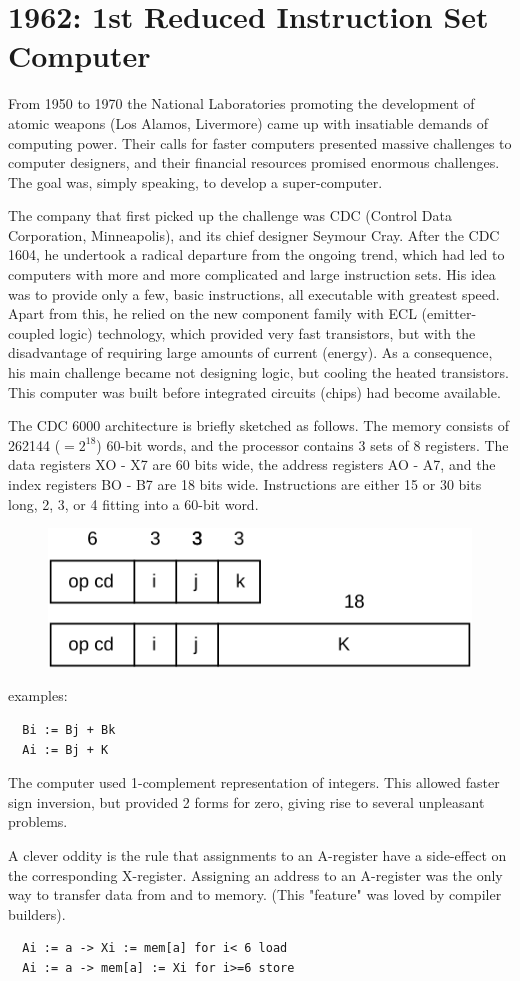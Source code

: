 \section{1962: 1st Reduced Instruction Set Computer}
From 1950 to 1970 the National Laboratories promoting the development of atomic
weapons (Los Alamos, Livermore) came up with insatiable demands of computing power.
Their calls for faster computers presented massive challenges to computer designers,
and their financial resources promised enormous challenges. The goal was, simply
speaking, to develop a super-computer.

The company that first picked up the challenge was CDC (Control Data Corporation,
Minneapolis), and its chief designer Seymour Cray. After the CDC 1604, he undertook
a radical departure from the ongoing trend, which had led to computers with more and
more complicated and large instruction sets. His idea was to provide only a few,
basic instructions, all executable with greatest speed. Apart from this, he relied on
the new component family with ECL (emitter-coupled logic) technology, which provided
very fast transistors, but with the disadvantage of requiring large amounts of current
(energy). As a consequence, his main challenge became not designing logic, but cooling
the heated transistors. This computer was built before integrated circuits (chips) had
become available.

The CDC 6000 architecture is briefly sketched as follows. The memory consists of
262144 ($=2^{18}$) 60-bit words, and the processor contains 3 sets of 8 registers.
The data registers XO - X7 are 60 bits wide, the address registers AO - A7, and the
index registers BO - B7 are 18 bits wide. Instructions are either 15 or 30 bits long,
2, 3, or 4 fitting into a 60-bit word.
\begin{figure}[h!]
  \centering
  \includegraphics[width=.5\textwidth]{i/2}
\end{figure}
examples:
\begin{verbatim}
  Bi := Bj + Bk
  Ai := Bj + K
\end{verbatim}

The computer used 1-complement representation of integers. This allowed faster
sign inversion, but provided 2 forms for zero, giving rise to several unpleasant
problems.

A clever oddity is the rule that assignments to an A-register have a side-effect on
the corresponding X-register. Assigning an address to an A-register was the only way
to transfer data from and to memory. (This "feature" was loved by compiler builders).
\begin{verbatim}
  Ai := a -> Xi := mem[a] for i< 6 load
  Ai := a -> mem[a] := Xi for i>=6 store
\end{verbatim}
